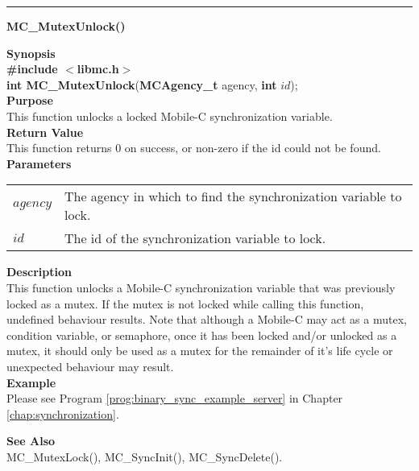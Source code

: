 \noindent
\vspace{5pt}
\rule{6.5in}{0.015in}
\noindent
{}
{\LARGE \bf MC\_MutexUnlock()}\\

\noindent
{\bf Synopsis}\\
{\bf \#include $<$libmc.h$>$}\\
{\bf int MC\_MutexUnlock}({\bf MCAgency\_t} agency, {\bf int} $id$);\\

\noindent
{\bf Purpose}\\
This function unlocks a locked Mobile-C synchronization variable.\\

\noindent
{\bf Return Value}\\
This function returns 0 on success, or non-zero if the id could not be found.\\

\noindent
{\bf Parameters}
\vspace{-0.1pt}
\begin{description}
\item
\begin{tabular}{p{10 mm}p{145 mm}} 
$agency$ & The agency in which to find the synchronization variable to lock.\\
$id$ & The id of the synchronization variable to lock. 
\end{tabular}
\end{description}

\noindent
{\bf Description}\\
This function unlocks a Mobile-C synchronization variable that was previously
locked as a mutex. 
If the mutex is not locked while calling this function, undefined behaviour 
results.
Note that although a Mobile-C may act as a mutex, condition variable, or 
semaphore, once it has been locked and/or unlocked as a mutex, it should only 
be used as a mutex for the remainder of it's life cycle or unexpected 
behaviour may result.\\

\noindent
{\bf Example}\\
Please see Program \vref{prog:binary_sync_example_server} in 
Chapter \ref{chap:synchronization}.\\
\noindent

\noindent
{\bf See Also}\\
MC\_MutexLock(), MC\_SyncInit(), MC\_SyncDelete().\\

